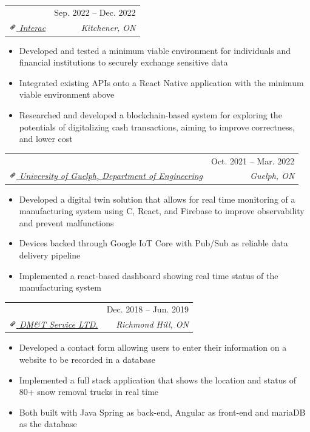 \documentclass[letterpaper, 10pt]{report}
\makeatletter
\newcommand{\resumeSubheading}[4]{
    \begin{tabular*}{\textwidth}[t]{l@{\extracolsep{\fill}}r}
        \textbf{#1}       & #2                \\
        \textit{\small#3} & \textit{\small#4} \\
    \end{tabular*}\vspace{-0.7em}
}
\newenvironment{ResumeItem}{
    \vspace{-0.3em}
    \begin{itemize}
        \setlength\itemsep{-0.3em}
        }{
    \end{itemize}\vspace{-0.3em}}
\newcommand{\cxx}{C\nolinebreak\hspace{-.05em}\raisebox{0.03ex}{\bf +}\nolinebreak\hspace{-.05em}\raisebox{.03ex}{\bf +}}
\newcommand{\linkIcon}{\includegraphics[height=9pt, trim=0 5cm 0 -1.5cm]{link-icon}}
\makeatother
\begin{document}
    \resumeSubheading
    {\color{Black}{Software Developer, Co-op}}{Sep. 2022 -- Dec. 2022}
    {\href{https://www.interac.ca/en/}{\linkIcon{} Interac}}{Kitchener, ON}
    \begin{ResumeItem}
        \item{Developed and tested a minimum viable environment for individuals and financial institutions to securely exchange sensitive data}
        \item{Integrated existing APIs onto a React Native application with the minimum viable environment above}
        \item{Researched and developed a blockchain-based system for exploring the potentials of digitalizing cash transactions, aiming to improve correctness, and lower cost}
    \end{ResumeItem}


    \resumeSubheading
    {\color{Black}{Undergraduate Research Assistant}} {Oct. 2021 -- Mar. 2022}
    {\href{https://www.uoguelph.ca/engineering/}{\linkIcon{} University of Guelph, Department of Engineering}}{Guelph, ON}

    \begin{ResumeItem}
        \item{Developed a digital twin solution that allows for real time monitoring of a manufacturing system using \cxx, React, and Firebase to improve observability and prevent malfunctions}
        \item{Devices backed through Google IoT Core with Pub/Sub as reliable data delivery pipeline}
        \item{Implemented a react-based dashboard showing real time status of the manufacturing system}
    \end{ResumeItem}



    \resumeSubheading
    {\color{Black}{Software Developer, Co-op}}{Dec. 2018 -- Jun. 2019}
    {\href{https://www.dmtserv.com/}{\linkIcon{} DM\&T Service LTD.}}{Richmond Hill, ON}
    \begin{ResumeItem}
        \item{Developed a contact form allowing users to enter their information on a website to be recorded in a database}
        \item{Implemented a full stack application that shows the location and status of 80+ snow removal trucks in real time}
        \item{Both built with Java Spring as back-end, Angular as front-end and mariaDB as the database}
    \end{ResumeItem}
\end{document}
